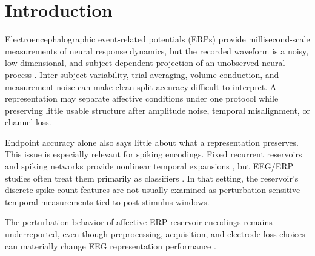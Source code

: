 \documentclass[conference]{IEEEtran}
\begin{document}
\section{Introduction}
Electroencephalographic event-related potentials (ERPs) provide millisecond-scale measurements of neural response dynamics, but the recorded waveform is a noisy, low-dimensional, and subject-dependent projection of an unobserved neural process \cite{makeig2002dynamic,blankertz2011singletrial}. Inter-subject variability, trial averaging, volume conduction, and measurement noise can make clean-split accuracy difficult to interpret. A representation may separate affective conditions under one protocol while preserving little usable structure after amplitude noise, temporal misalignment, or channel loss.

Endpoint accuracy alone also says little about what a representation preserves. This issue is especially relevant for spiking encodings. Fixed recurrent reservoirs and spiking networks provide nonlinear temporal expansions \cite{maass2002real,lukosevicius2009reservoir}, but EEG/ERP studies often treat them primarily as classifiers \cite{gong2023sglnet,craik2019deep}. In that setting, the reservoir's discrete spike-count features are not usually examined as perturbation-sensitive temporal measurements tied to post-stimulus windows.

The perturbation behavior of affective-ERP reservoir encodings remains underreported, even though preprocessing, acquisition, and electrode-loss choices can materially change EEG representation performance \cite{delpup2025preprocessing,chiang2023depression,guo2025mma}.
\end{document}

